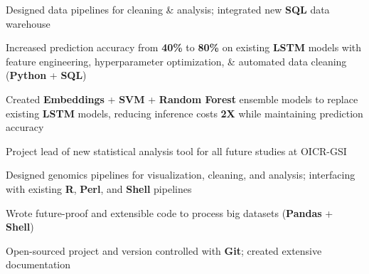 \documentclass[]{chandan-cv}
\begin{document}
\begin{minipage}[t]{0.78\textwidth}
\begin{tightemize}
        \item Designed data pipelines for cleaning \& analysis; integrated new \textbf{SQL} data warehouse
        \item Increased prediction accuracy from \textbf{40\%} to \textbf{80\%} on existing \textbf{LSTM} 
  models with feature engineering, hyperparameter optimization, \& automated data cleaning (\textbf{Python} + \textbf{SQL})
        \item Created \textbf{Embeddings} + \textbf{SVM} + \textbf{Random Forest} ensemble models to replace existing 
  \textbf{LSTM} models, reducing inference costs \textbf{2X} while maintaining prediction accuracy
\end{tightemize}
\sectionsep

\begin{tightemize}
	\item Project lead of new statistical analysis tool for all future studies at OICR-GSI
	\item Designed genomics pipelines for visualization, cleaning, and analysis; 
	interfacing with existing \textbf{R}, \textbf{Perl}, and \textbf{Shell} pipelines
	\item Wrote future-proof and extensible code to process big datasets (\textbf{Pandas} + \textbf{Shell})
	\item Open-sourced project and version controlled with \textbf{Git}; created extensive documentation
\end{tightemize}
\sectionsep
\end{minipage}

\newpage
\end{document}
